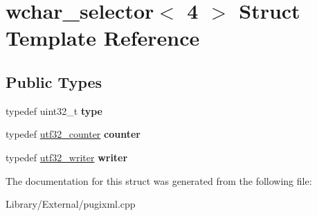 \hypertarget{structwchar__selector_3_014_01_4}{}\section{wchar\+\_\+selector$<$ 4 $>$ Struct Template Reference}
\label{structwchar__selector_3_014_01_4}
\subsection*{Public Types}
\begin{DoxyCompactItemize}
\item 
\hypertarget{structwchar__selector_3_014_01_4_af45ac603ab6fefec66e5c29044b4eed6}{}typedef uint32\+\_\+t {\bfseries type}\label{structwchar__selector_3_014_01_4_af45ac603ab6fefec66e5c29044b4eed6}

\item 
\hypertarget{structwchar__selector_3_014_01_4_a7d7c585ae0819660112b8c8683971b97}{}typedef \hyperlink{structutf32__counter}{utf32\+\_\+counter} {\bfseries counter}\label{structwchar__selector_3_014_01_4_a7d7c585ae0819660112b8c8683971b97}

\item 
\hypertarget{structwchar__selector_3_014_01_4_a48042e7fe51c4661397ae7afe3905243}{}typedef \hyperlink{structutf32__writer}{utf32\+\_\+writer} {\bfseries writer}\label{structwchar__selector_3_014_01_4_a48042e7fe51c4661397ae7afe3905243}

\end{DoxyCompactItemize}


The documentation for this struct was generated from the following file\+:\begin{DoxyCompactItemize}
\item 
Library/\+External/pugixml.\+cpp\end{DoxyCompactItemize}
